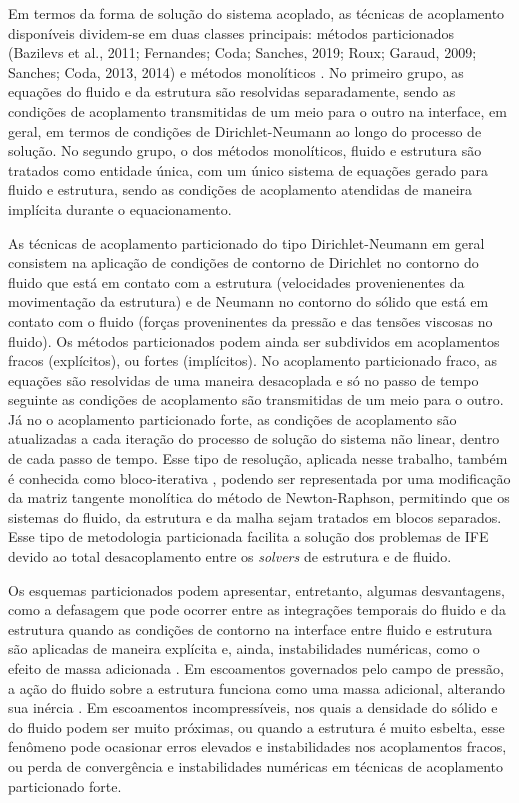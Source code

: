 Em termos da forma de solução do sistema acoplado, as técnicas de acoplamento disponíveis dividem-se em duas classes principais: métodos particionados (Bazilevs et al.,
2011; Fernandes; Coda; Sanches, 2019; Roux; Garaud, 2009; Sanches; Coda, 2013, 2014) e métodos monolíticos \cite{Avancini:2023,Blom:1998,Hubneretal:2004,HronM:2007}. No primeiro grupo, as equações do fluido e da estrutura são resolvidas separadamente, sendo as condições de acoplamento transmitidas de um meio para o outro na interface, em geral, em termos de condições de Dirichlet-Neumann ao longo do processo de solução. No segundo grupo, o dos métodos monolíticos, fluido e estrutura são tratados como entidade única, com um único sistema de equações gerado para fluido e estrutura, sendo as condições de acoplamento atendidas de maneira implícita durante o equacionamento.

As técnicas de acoplamento particionado do tipo Dirichlet-Neumann em geral consistem na aplicação de condições de contorno de Dirichlet no contorno do fluido que está em contato com a estrutura (velocidades provenienentes da movimentação da estrutura) e de Neumann no contorno do sólido que está em contato com o fluido (forças proveninentes da pressão e das tensões viscosas no fluido). Os métodos particionados podem ainda ser subdividos em acoplamentos fracos (explícitos), ou fortes (implícitos). No acoplamento particionado fraco, as equações são resolvidas de uma maneira desacoplada e só no passo de tempo seguinte as condições de acoplamento são transmitidas de um meio para o outro. Já no o acoplamento particionado forte, as condições de acoplamento são atualizadas a cada iteração do processo de solução do sistema não linear, dentro de cada passo de tempo. Esse tipo de resolução, aplicada nesse trabalho, também é conhecida como bloco-iterativa \cite{BazilevsTT:2013a}, podendo ser representada por uma  modificação da matriz tangente monolítica do método de Newton-Raphson, permitindo que os sistemas do fluido, da estrutura e da malha sejam tratados em blocos separados. Esse tipo de metodologia particionada facilita a solução dos problemas de IFE devido ao total desacoplamento entre os \textit{solvers} de estrutura e de fluido.

Os esquemas particionados podem apresentar, entretanto, algumas desvantagens, como a defasagem que pode ocorrer entre as integrações temporais do fluido e da estrutura quando as condições de contorno na interface entre fluido e estrutura são aplicadas de maneira explícita e, ainda, instabilidades numéricas, como o efeito de massa adicionada \cite{FelippaPF:2001}. Em escoamentos governados pelo campo de pressão, a ação do fluido sobre a estrutura funciona como uma massa adicional, alterando sua inércia \cite{TallecM:2001}. Em escoamentos incompressíveis, nos quais a densidade do sólido e do fluido podem ser muito próximas, ou quando a estrutura é muito esbelta, esse fenômeno pode ocasionar erros elevados e instabilidades nos acoplamentos fracos, ou  perda de convergência e instabilidades numéricas em técnicas de acoplamento particionado forte. 

